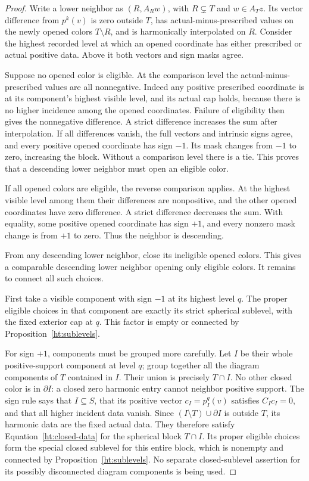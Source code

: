 \begin{proof}
Write a lower neighbor as \((R,A_Rw)\), with
\(R\subsetneq T\) and \(w\in A_Tz\).  Its vector difference from
\(p^k(v)\) is zero outside \(T\), has actual-minus-prescribed values on
the newly opened colors \(T\setminus R\), and is harmonically
interpolated on \(R\).
Consider the highest recorded level at which an opened coordinate has
either prescribed or actual positive data.
Above it both vectors and sign masks agree.

Suppose no opened color is eligible.
At the comparison level the actual-minus-prescribed values are all
nonnegative.  Indeed any positive prescribed coordinate is at its
component's highest visible level, and its actual cap holds, because
there is no higher incidence among the opened coordinates.
Failure of eligibility then gives the nonnegative difference.
A strict difference increases the sum after interpolation.
If all differences vanish, the full vectors and intrinsic signs agree,
and every positive opened coordinate has sign \(-1\).  Its mask changes
from \(-1\) to zero, increasing the block.
Without a comparison level there is a tie.
This proves that a descending lower neighbor must open an eligible
color.

If all opened colors are eligible, the reverse comparison applies.
At the highest visible level among them their differences are
nonpositive, and the other opened coordinates have zero difference.
A strict difference decreases the sum.  With equality, some positive
opened coordinate has sign \(+1\), and every nonzero mask change is
from \(+1\) to zero.  Thus the neighbor is descending.

From any descending lower neighbor, close its ineligible opened
colors.  This gives a comparable descending lower neighbor opening
only eligible colors.  It remains to connect all such choices.

First take a visible component with sign \(-1\) at its highest level
\(q\).  The proper eligible choices in that component are exactly its
strict spherical sublevel, with the fixed exterior cap at \(q\).
This factor is empty or connected by Proposition~\ref{ht:sublevels}.

For sign \(+1\), components must be grouped more carefully.
Let \(I\) be their whole positive-support component at level \(q\);
group together all the diagram components of \(T\) contained in \(I\).
Their union is precisely \(T\cap I\).
No other closed color is in \(\partial I\): a closed zero harmonic
entry cannot neighbor positive support.
The sign rule says that \(I\subseteq S\), that its positive vector
\(c_I=p_I^q(v)\) satisfies \(C_Ic_I=0\), and that all higher incident
data vanish.
Since \((I\setminus T)\cup\partial I\) is outside \(T\), its harmonic
data are the fixed actual data.  They therefore satisfy
Equation~\eqref{ht:closed-data} for the spherical block \(T\cap I\).
Its proper eligible choices form the special closed sublevel for
this entire block, which is nonempty and connected by
Proposition~\ref{ht:sublevels}.  No separate closed-sublevel assertion
for its possibly disconnected diagram components is being used.


\end{proof}
